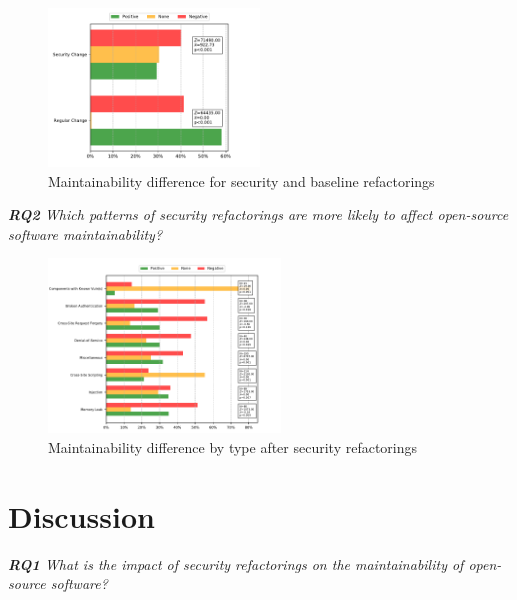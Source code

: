 \documentclass[10pt,conference]{IEEEtran}
\begin{document}
\begin{figure}[h]
 	\centering 	\includegraphics[width=0.5\textwidth]{figures/maintainability.pdf}
 	\caption{Maintainability difference for security and baseline refactorings}
	\label{fig:secvsreg}
\end{figure}





\begin{framed}
\textit{\textbf{RQ2} Which patterns of security refactorings are more likely to affect open-source software maintainability?}
\end{framed}



\begin{figure}[h]
 	\centering
 	\includegraphics[width=0.55\textwidth]{figures/category.pdf}
 	\caption{Maintainability difference by type after security refactorings}
	\label{fig:pat}
\end{figure}


\section{Discussion}\label{sec:discussion}


\begin{framed}
\textit{\textbf{RQ1} What is the impact of security refactorings on the maintainability of open-source software?}
\end{framed}
\end{document}
